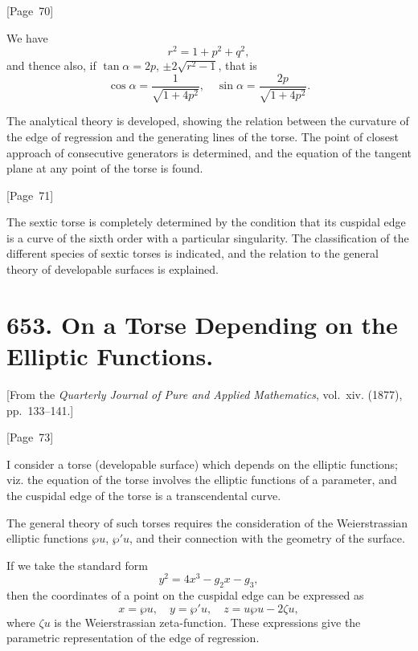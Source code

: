 \documentclass[11pt,a4paper]{book}
\begin{document}
\begin{center}
[Page~70]
\end{center}

We have
\[
r^2 = 1 + p^2 + q^2,
\]
and thence also, if $\tan\alpha = 2p$, $\pm 2\sqrt{r^2-1}$, that is
\[
\cos\alpha = \frac{1}{\sqrt{1+4p^2}}, \quad
\sin\alpha = \frac{2p}{\sqrt{1+4p^2}}.
\]

The analytical theory is developed, showing the relation between the
curvature of the edge of regression and the generating lines of the
torse. The point of closest approach of consecutive generators is
determined, and the equation of the tangent plane at any point of the
torse is found.

\begin{center}
[Page~71]
\end{center}

The sextic torse is completely determined by the condition that its
cuspidal edge is a curve of the sixth order with a particular
singularity. The classification of the different species of sextic
torses is indicated, and the relation to the general theory of
developable surfaces is explained.


\newpage
\section*{653. On a Torse Depending on the Elliptic Functions.}

[From the \textit{Quarterly Journal of Pure and Applied Mathematics},
vol.~xiv. (1877), pp.~133--141.]

\begin{center}
[Page~73]
\end{center}

I consider a torse (developable surface) which depends on the elliptic
functions; viz. the equation of the torse involves the elliptic
functions of a parameter, and the cuspidal edge of the torse is a
transcendental curve.

The general theory of such torses requires the consideration of the
Weierstrassian elliptic functions $\wp u$, $\wp' u$, and their
connection with the geometry of the surface.

If we take the standard form
\[
y^2 = 4x^3 - g_2x - g_3,
\]
then the coordinates of a point on the cuspidal edge can be expressed as
\[
x = \wp u, \quad y = \wp' u, \quad z = u \wp u - 2\zeta u,
\]
where $\zeta u$ is the Weierstrassian zeta-function. These expressions
give the parametric representation of the edge of regression.
\end{document}
